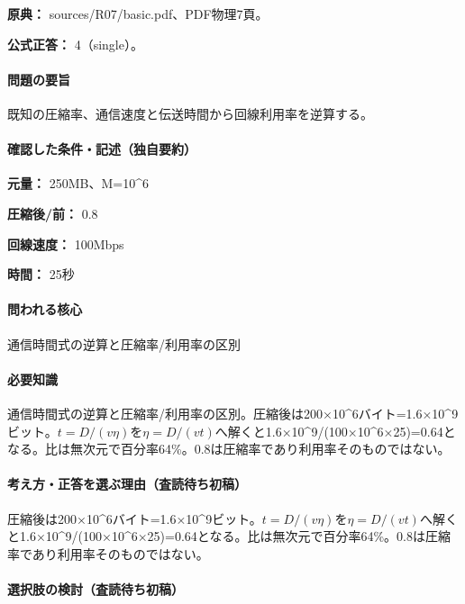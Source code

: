 \noindent\textbf{原典：} sources/R07/basic.pdf、PDF物理7頁。

\textbf{公式正答：} 4（single）。

\paragraph{問題の要旨} 既知の圧縮率、通信速度と伝送時間から回線利用率を逆算する。

\paragraph{確認した条件・記述（独自要約）}\mbox{}\par

\noindent\textbf{元量：} 250MB、M=\allowbreak{}10\textasciicircum{}6\par

\noindent\textbf{圧縮後/前：} 0.8\par

\noindent\textbf{回線速度：} 100Mbps\par

\noindent\textbf{時間：} 25秒\par

\paragraph{問われる核心} 通信時間式の逆算と圧縮率/利用率の区別

\paragraph{必要知識} 通信時間式の逆算と圧縮率/利用率の区別。圧縮後は200×10\textasciicircum{}6バイト=1.6×10\textasciicircum{}9ビット。\(t=D/(v\eta)\)を\(\eta=D/(vt)\)へ解くと1.6×10\textasciicircum{}9/(100×10\textasciicircum{}6×25)=\allowbreak{}0.64となる。比は無次元で百分率64\%。0.8は圧縮率であり利用率そのものではない。

\paragraph{考え方・正答を選ぶ理由（査読待ち初稿）} 圧縮後は200×10\textasciicircum{}6バイト=1.6×10\textasciicircum{}9ビット。\(t=D/(v\eta)\)を\(\eta=D/(vt)\)へ解くと1.6×10\textasciicircum{}9/(100×10\textasciicircum{}6×25)=\allowbreak{}0.64となる。比は無次元で百分率64\%。0.8は圧縮率であり利用率そのものではない。

\paragraph{選択肢の検討（査読待ち初稿）}\mbox{}\par

